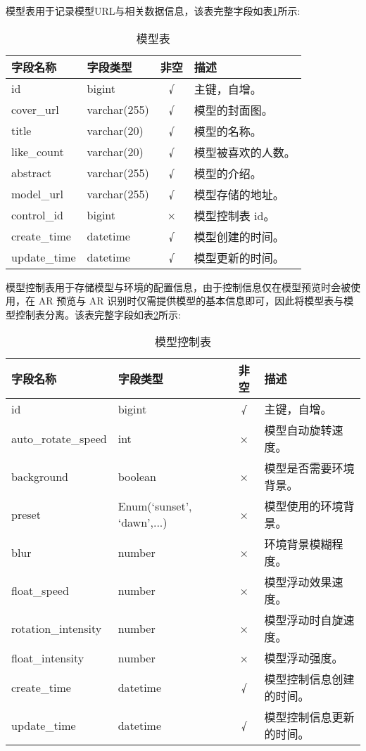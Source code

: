 模型表用于记录模型URL与相关数据信息，该表完整字段如表\ref{table:模型表}所示:

\begin{table}[H]
  \centering
  \small
  \caption{模型表}
  \label{table:模型表}
  \setlength{\tabcolsep}{10.2mm}
  \begin{tabular}{l|l|c|l}
    \toprule
    \textbf{字段名称} & \textbf{字段类型} & \textbf{非空} & \textbf{描述} \\
    \midrule
    id & bigint & √ & 主键，自增。 \\
    cover\_url & varchar(255) & √ & 模型的封面图。 \\
    title & varchar(20) & √ & 模型的名称。 \\
    like\_count & varchar(20) & √ & 模型被喜欢的人数。 \\
    abstract & varchar(255) & √ & 模型的介绍。 \\
    model\_url & varchar(255) & √ & 模型存储的地址。 \\
    control\_id & bigint & × & 模型控制表 id。 \\
    create\_time & datetime & √ & 模型创建的时间。 \\
    update\_time & datetime & √ & 模型更新的时间。 \\
    \bottomrule
  \end{tabular}
\end{table}

模型控制表用于存储模型与环境的配置信息，由于控制信息仅在模型预览时会被使用，在 AR 预览与 AR 识别时仅需提供模型的基本信息即可，因此将模型表与模型控制表分离。该表完整字段如表\ref{table:模型控制表}所示:

\begin{table}[H]
  \centering
  \small
  \caption{模型控制表}
  \label{table:模型控制表}
  \setlength{\tabcolsep}{6.3mm}
  \begin{tabular}{l|l|c|l}
    \toprule
    \textbf{字段名称} & \textbf{字段类型} & \textbf{非空} & \textbf{描述} \\
    \midrule
    id & bigint & √ & 主键，自增。 \\
    auto\_rotate\_speed & int & × & 模型自动旋转速度。 \\
    background & boolean & × & 模型是否需要环境背景。 \\
    preset & Enum(`sunset', `dawn',...) & × & 模型使用的环境背景。 \\
    blur & number & × & 环境背景模糊程度。 \\
    float\_speed & number & × & 模型浮动效果速度。 \\
    rotation\_intensity & number & × & 模型浮动时自旋速度。 \\
    float\_intensity & number & × & 模型浮动强度。 \\
    create\_time & datetime & √ & 模型控制信息创建的时间。 \\
    update\_time & datetime & √ & 模型控制信息更新的时间。 \\
    \bottomrule
  \end{tabular}
\end{table}

